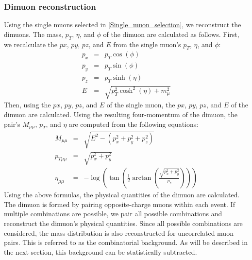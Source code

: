             \subsubsection{Dimuon reconstruction}
            \label{Dimuon_reco}
                Using the single muons selected in \ref{Single_muon_selection}, we reconstruct the dimuons. The mass, $p_T$, $\eta$, and $\phi$ of the dimuon are calculated as follows. First, we recalculate the $px$, $py$, $pz$, and $E$ from the single muon’s $p_T$, $\eta$, and $\phi$:
                \begin{eqnarray}
                    p_x &=& p_T \cos(\phi)\\
                    p_y &=& p_T \sin (\phi)\\
                    p_z &=& p_T \sinh (\eta)\\
                    E &=& \sqrt{p_T^2 \cosh^2(\eta) + m_\mu^2} 
                \end{eqnarray}
                Then, using the $px$, $py$, $pz$, and $E$ of the single muon, the $px$, $py$, $pz$, and $E$ of the dimuon are calculated. Using the resulting four-momentum of the dimuon, the pair’s $M_{\mu\mu}$, $p_T$, and $\eta$ are computed from the following equations:
                \begin{eqnarray}
                    M_{\mu\mu} &=& \sqrt{E^2 - (p_x^2 + p_y^2 + p_z^2)}\\
                    p_{T\mu\mu} &=& \sqrt{p_x^2 + p_y^2}\\
                    \eta_{\mu\mu} &=& -\log\left(\tan\left(\frac{1}{2}\arctan\left(\frac{\sqrt{p_x^2 + p_y^2}}{p_z}\right)\right)\right)
                \end{eqnarray}
                Using the above formulas, the physical quantities of the dimuon are calculated.
                The dimuon is formed by pairing opposite-charge muons within each event. If multiple combinations are possible, we pair all possible combinations and reconstruct the dimuon’s physical quantities. Since all possible combinations are considered, the mass distribution is also reconstructed for uncorrelated muon pairs. This is referred to as the combinatorial background. As will be described in the next section, this background can be statistically subtracted.
                
